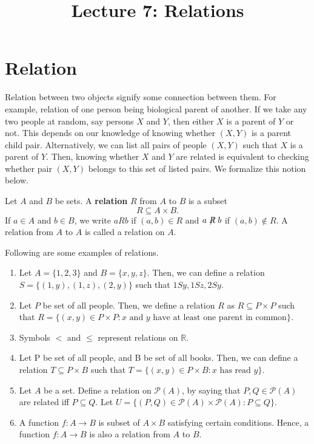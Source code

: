 \documentclass[a4paper,english,12pt]{article}
\title{Lecture 7: Relations}
\author{}
\begin{document}
\maketitle

\section{Relation}
Relation between two objects signify some connection between them. For example, relation of one person being biological parent of another. If we take any two people at random, say persons $X$ and $Y$, then either $X$ is a parent of $Y$ or not. This depends on our knowledge of knowing whether $(X,Y)$ is a parent child pair. Alternatively, we can list all pairs of people $(X,Y)$ such that $X$ is a parent of $Y$. Then, knowing whether $X$ and $Y$ are related is equivalent to checking whether pair $(X,Y)$  belongs to this set of listed pairs. We formalize this notion below.
\begin{defn}[Relation] Let $A$ and $B$ be sets. A \textbf{relation} $R$ from $A$ to $B$ is a subset
\begin{equation*}
R \subseteq A \times B. 
\end{equation*}
If $a \in A$ and $b \in B$, we write $aRb$ if $(a,b) \in R$ and $a \centernot R b$ if $(a,b) \notin R$. A relation from $A$ to $A$ is called a relation on $A$.
\end{defn}
\begin{exmp} Following are some examples of relations.
\begin{enumerate}
\item Let $A=\{1,2,3\}$ and $B =\{x,y,z\}$. Then, we can define a relation $S = \{(1,y),(1,z),(2,y)\}$ such that $1Sy, 1Sz, 2Sy$.
\item Let $P$ be set of all people. Then, we define a relation $R$ as $R \subseteq P \times P$ such that $R =\{(x,y) \in P \times P :x \text{ and } y \text{ have at least one parent in common}\}$.
\item Symbols $<$ and $\leq$ represent relations on $\mathbb{R}$.
\item Let P be set of all people, and B be set of all books. Then, we can define a relation $T \subseteq P \times B$ such that $T=\{(x,y) \in P \times B: x \text{ has read } y \}$. 
\item Let $A$ be a set. Define a relation on $\mathcal{P}(A)$, by saying that $P,Q \in \mathcal{P}(A)$ are related iff $P \subseteq Q$. Let $U =\{(P,Q) \in \mathcal{P}(A) \times \mathcal{P}(A) : P \subseteq Q\}$.
\item A function $f: A \to B$ is subset of $A \times B$ satisfying certain conditions. Hence, a function $f: A \to B$ is also a relation from $A$ to $B$.
\end{enumerate}
\end{exmp}
\end{document}
